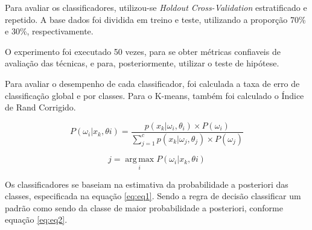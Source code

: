 

Para avaliar os classificadores, utilizou-se \textit{Holdout Cross-Validation} estratificado e repetido. A base dados foi dividida em treino e teste, utilizando a proporção 70\% e 30\%, respectivamente.

O experimento foi executado 50 vezes, para se obter métricas confiaveis de avaliação das técnicas, e para, posteriormente, utilizar o teste de hipótese.

Para avaliar o desempenho de cada classificador, foi calculada a taxa de erro de classificação global e por classes. Para o K-means, também foi calculado o Índice de Rand Corrigido.

\begin{equation}
\label{eq:eq1}
P(\omega_{i} | x_{k},\theta{i}) = \dfrac{p(x_k| \omega_i, \theta_i) \times P(\omega_i)}{\sum_{j=1}^c p(x_k | \omega_j, \theta_j) \times P(\omega_j)}
\end{equation}

\begin{equation}
\label{eq:eq2}
j = \operatorname*{arg\,max}_i P(\omega_{i} | x_{k},\theta{i})
\end{equation}

Os classificadores se baseiam na estimativa da probabilidade a posteriori das classes, especificada na equação \ref{eq:eq1}. Sendo a regra de decisão classificar um padrão como sendo da classe de maior probabilidade a posteriori, conforme equação \ref{eq:eq2}.


